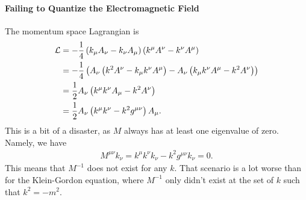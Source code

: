 \paragraph{Failing to Quantize the Electromagnetic Field}
The momentum space Lagrangian is
\begin{align*}
	\mathcal{L} &= -\frac{1}{4}\left(k_{\mu}A_{\nu} - k_{\nu}A_{\mu}\right)\left(k^{\mu}A^{\nu} - k^{\nu}A^{\mu}\right) \\
	     &= -\frac{1}{4}\left(A_{\nu}\left(k^{2}A^{\nu} - k_{\mu}k^{\nu}A^{\mu}\right) - A_{\nu}\left(k_{\mu}k^{\nu}A^{\mu} - k^{2}A^{\nu}\right)\right) \\
	     &= \frac{1}{2}A_{\nu}\left(k^{\mu}k^{\nu}A_{\mu} - k^{2}A^{\nu}\right) \\
	     &= \frac{1}{2}A_{\nu}\left(k^{\mu}k^{\nu} - k^{2}g^{\mu\nu}\right)A_{\mu}.
\end{align*}
This is a bit of a disaster, as $M$ always has at least one eigenvalue of zero. Namely, we have
\begin{align*}
	M^{\mu\nu}k_{\nu} = k^{\mu}k^{\nu}k_{\nu} - k^{2}g^{\mu\nu}k_{\nu} = 0.
\end{align*}
This means that $M^{-1}$ does not exist for any $k$. That scenario is a lot worse than for the Klein-Gordon equation, where $M^{-1}$ only didn't exist at the set of $k$ such that $k^{2} = -m^{2}$.

